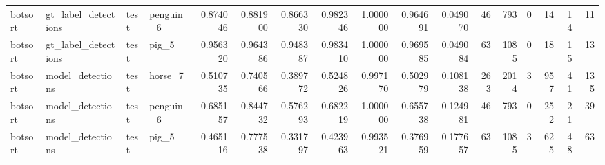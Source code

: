 \begin{table}
\begin{tabular}{llllrrrrrrrrrrrrr}
botsort & gt_label_detections & test & penguin_6 & 0.874046 & 0.881900 & 0.866330 & 0.982346 & 1.000000 & 0.964691 & 0.049070 & 46 & 793 & 0 & 14 & 14 & 11 \\
botsort & gt_label_detections & test & pig_5 & 0.956320 & 0.964386 & 0.948387 & 0.983410 & 1.000000 & 0.969585 & 0.049084 & 63 & 1085 & 0 & 18 & 15 & 13 \\
botsort & model_detections & test & horse_7 & 0.510735 & 0.740566 & 0.389772 & 0.524826 & 0.997170 & 0.502979 & 0.108138 & 263 & 2014 & 3 & 957 & 41 & 135 \\
botsort & model_detections & test & penguin_6 & 0.685157 & 0.844732 & 0.576293 & 0.682219 & 1.000000 & 0.655738 & 0.124981 & 46 & 793 & 0 & 252 & 21 & 39 \\
botsort & model_detections & test & pig_5 & 0.465116 & 0.777538 & 0.331797 & 0.423963 & 0.993521 & 0.376959 & 0.177657 & 63 & 1085 & 3 & 625 & 48 & 63 \\
\bottomrule
\end{tabular}
\end{table}
